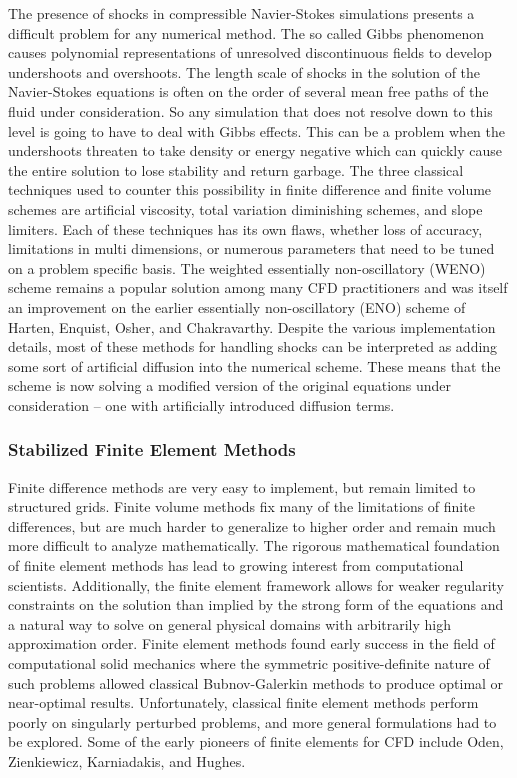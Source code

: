 \documentclass[Dissertation.tex]{subfiles}
\begin{document}
The presence of shocks in compressible Navier-Stokes simulations presents a difficult problem for any numerical method.
The so called Gibbs phenomenon causes polynomial representations of unresolved discontinuous fields to develop undershoots and overshoots.
The length scale of shocks in the solution of the Navier-Stokes equations is often on the order of several mean free paths of the fluid under consideration.
So any simulation that does not resolve down to this level is going to have to deal with Gibbs effects.
This can be a problem when the undershoots threaten to take density or energy negative which can quickly cause the entire solution to
lose stability and return garbage.
The three classical techniques used to counter this possibility in finite difference and finite volume schemes are artificial viscosity,
total variation diminishing schemes, and slope limiters.
Each of these techniques has its own flaws, whether loss of accuracy, limitations in multi dimensions, or numerous parameters that need
to be tuned on a problem specific basis.
The weighted essentially non-oscillatory (WENO) scheme\cite{WENO} remains a popular solution among many CFD practitioners and was itself an improvement
on the earlier essentially non-oscillatory (ENO) scheme of Harten, Enquist, Osher, and Chakravarthy\cite{ENO}.
Despite the various implementation details, most of these methods for handling shocks can be interpreted as adding some sort of artificial diffusion
into the numerical scheme.
These means that the scheme is now solving a modified version of the original equations under consideration
-- one with artificially introduced diffusion terms.

\subsubsection{Stabilized Finite Element Methods}
Finite difference methods are very easy to implement, but remain limited to structured grids.
Finite volume methods fix many of the limitations of finite differences,
but are much harder to generalize to higher order and remain much more difficult to analyze mathematically.
The rigorous mathematical foundation of finite element methods has lead to growing interest from computational scientists.
Additionally, the finite element framework allows for weaker regularity constraints on the solution than implied by the strong form of the equations
and a natural way to solve on general physical domains with arbitrarily high approximation order.
Finite element methods found early success in the field of computational solid mechanics where the symmetric positive-definite nature of such problems
allowed classical Bubnov-Galerkin methods to produce optimal or near-optimal results.
Unfortunately, classical finite element methods perform poorly on singularly perturbed problems,
and more general formulations had to be explored.
Some of the early pioneers of finite elements for CFD include Oden, Zienkiewicz, Karniadakis, and Hughes\cite{ChungCFD}.
\end{document}
